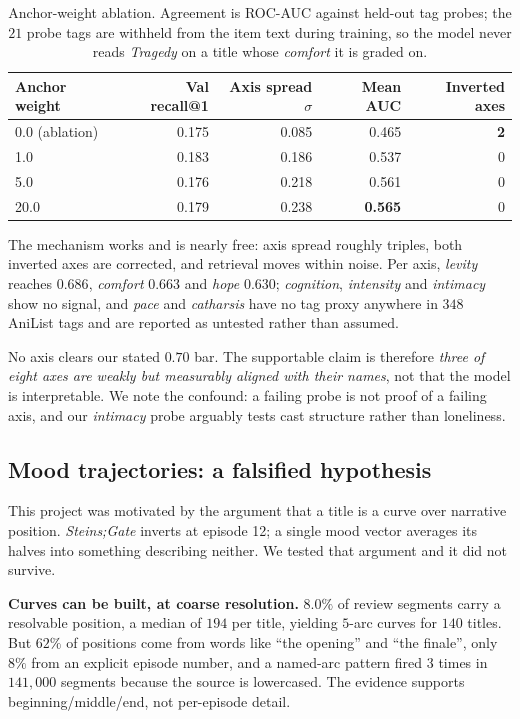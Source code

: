 \documentclass[11pt,a4paper]{article}
\begin{document}
\begin{table}[h]
\centering
\caption{Anchor-weight ablation. Agreement is ROC-AUC against held-out tag
probes; the $21$ probe tags are withheld from the item text during training, so
the model never reads \emph{Tragedy} on a title whose \emph{comfort} it is
graded on.}
\begin{tabular}{lrrrr}
\toprule
Anchor weight & Val recall@1 & Axis spread $\sigma$ & Mean AUC & Inverted axes \\
\midrule
0.0 (ablation) & 0.175 & 0.085 & 0.465 & \textbf{2} \\
1.0            & 0.183 & 0.186 & 0.537 & 0 \\
5.0            & 0.176 & 0.218 & 0.561 & 0 \\
20.0           & 0.179 & 0.238 & \textbf{0.565} & 0 \\
\bottomrule
\end{tabular}
\end{table}

The mechanism works and is nearly free: axis spread roughly triples, both
inverted axes are corrected, and retrieval moves within noise. Per axis,
\emph{levity} reaches $0.686$, \emph{comfort} $0.663$ and \emph{hope} $0.630$;
\emph{cognition}, \emph{intensity} and \emph{intimacy} show no signal, and
\emph{pace} and \emph{catharsis} have no tag proxy anywhere in $348$ AniList
tags and are reported as untested rather than assumed.

No axis clears our stated $0.70$ bar. The supportable claim is therefore
\emph{three of eight axes are weakly but measurably aligned with their names},
not that the model is interpretable. We note the confound: a failing probe is
not proof of a failing axis, and our \emph{intimacy} probe arguably tests cast
structure rather than loneliness.

\subsection{Mood trajectories: a falsified hypothesis}
\label{sec:trajectory}

This project was motivated by the argument that a title is a curve over
narrative position. \emph{Steins;Gate} inverts at episode 12; a single mood
vector averages its halves into something describing neither. We tested that
argument and it did not survive.

\textbf{Curves can be built, at coarse resolution.} $8.0\%$ of review segments
carry a resolvable position, a median of $194$ per title, yielding $5$-arc curves
for $140$ titles. But $62\%$ of positions come from words like ``the opening''
and ``the finale'', only $8\%$ from an explicit episode number, and a
named-arc pattern fired $3$ times in $141{,}000$ segments because the source is
lowercased. The evidence supports beginning/middle/end, not per-episode detail.
\end{document}
